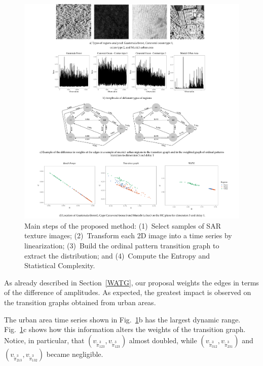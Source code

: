 \documentclass[journal]{IEEEtran}
\begin{document}
\begin{figure}[hbt]
	\includegraphics[width=2\columnwidth]{Figures/example.pdf}
	\caption{Main steps of the proposed method: 
		(1)~Select samples of SAR texture images;
		(2)~Transform each 2D image into a time series by linearization;
		(3)~Build the ordinal pattern transition graph to extract the distribution; and
		(4)~Compute the Entropy and Statistical Complexity.}
	\label{fig:example}
\end{figure}

As already described in Section~\ref{WATG}, our proposal weights the edges in terms of the difference of amplitudes.
As expected, the greatest impact is observed on the transition graphs obtained from urban areas.

The urban area time series shown in Fig.~\ref{fig:example}b has the largest dynamic range.
Fig.~\ref{fig:example}c shows how this information alters the weights of the transition graph.
Notice, in particular, that 
$(v_{\widetilde \pi^3_{123}}, v_{\widetilde \pi^3_{123}})$ almost doubled, while 
$(v_{\widetilde \pi^3_{312}}, v_{\widetilde \pi^3_{231}})$ and $(v_{\widetilde \pi^3_{213}}, v_{\widetilde \pi^3_{132}})$ became negligible.
\end{document}
